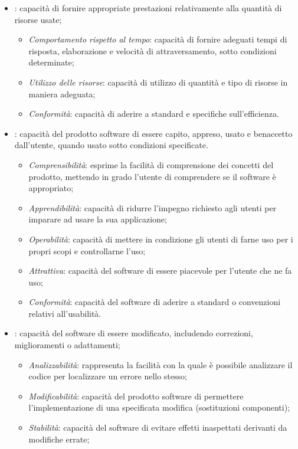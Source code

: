 \begin{itemize}
\begin{itemize}
	\end{itemize}
	\item {}: capacità di fornire appropriate prestazioni relativamente alla quantità di risorse usate;
		\begin{itemize}
			\item \emph{Comportamento rispetto al tempo}: capacità di fornire adeguati tempi di risposta, elaborazione e velocità di attraversamento, sotto condizioni determinate;
			\item \emph{Utilizzo delle risorse}: capacità di utilizzo di quantità e tipo di risorse in maniera adeguata;
			\item \emph{Conformità}: capacità di aderire a standard e specifiche sull'efficienza.
		\end{itemize}
	\item {}: capacità del prodotto software di essere capito, appreso, usato e benaccetto dall'utente, quando usato sotto condizioni specificate.
		\begin{itemize}
			\item \emph{Comprensibilità}: esprime la facilità di comprensione dei concetti del prodotto, mettendo in grado l'utente di comprendere se il software è appropriato;
			\item \emph{Apprendibilità}: capacità di ridurre l'impegno richiesto agli utenti per imparare ad usare la sua applicazione;
			\item \emph{Operabilità}: capacità di mettere in condizione gli utenti di farne uso per i propri scopi e controllarne l'uso;
			\item \emph{Attrattiva}: capacità del software di essere piacevole per l'utente che ne fa uso;
			\item \emph{Conformità}: capacità del software di aderire a standard o convenzioni relativi all'usabilità.			
		\end{itemize}
	\item {}: capacità del software di essere modificato, includendo correzioni, miglioramenti o adattamenti;
		\begin{itemize}
			\item \emph{Analizzabilità}: rappresenta la facilità con la quale è possibile analizzare il codice per localizzare un errore nello stesso;
			\item \emph{Modificabilità}: capacità del prodotto software di permettere l'implementazione di una specificata modifica (sostituzioni componenti);
			\item \emph{Stabilità}: capacità del software di evitare effetti inaspettati derivanti da modifiche errate;

\end{itemize}
\end{itemize}
